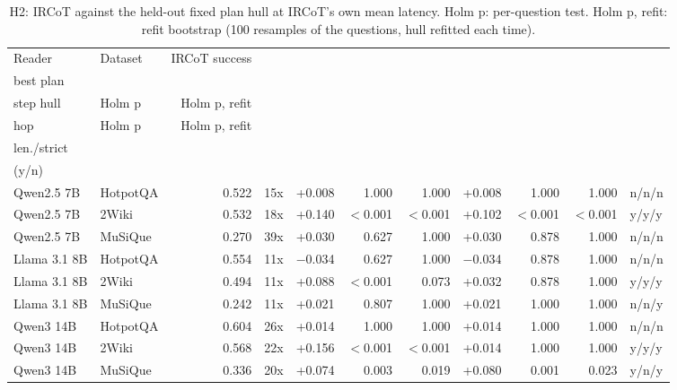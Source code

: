 \begin{table}[t]
\centering\small
\setlength{\tabcolsep}{2pt}
\caption{H2: IRCoT against the held-out fixed plan hull at IRCoT's own mean latency. Holm p: per-question test. Holm p, refit: refit bootstrap (100 resamples of the questions, hull refitted each time).}
\label{tab:h3}
\begin{tabular*}{\linewidth}{@{\extracolsep{\fill}}llrrrrrrrrl}
\toprule
Reader & Dataset & IRCoT success & \begin{tabular}[b]{@{}r@{}}Latency vs \\ best plan\end{tabular} & \begin{tabular}[b]{@{}r@{}}Gain, single \\ step hull\end{tabular} & Holm p & Holm p, refit & \begin{tabular}[b]{@{}r@{}}Gain, with two \\ hop\end{tabular} & Holm p  & Holm p, refit  & \begin{tabular}[b]{@{}l@{}}Sig. final/ \\ len./strict \\ (y/n)\end{tabular} \\
\midrule
Qwen2.5 7B & HotpotQA & 0.522 & 15x & +0.008 & 1.000 & 1.000 & +0.008 & 1.000 & 1.000 & n/n/n \\
Qwen2.5 7B & 2Wiki & 0.532 & 18x & +0.140 & $<$0.001 & $<$0.001 & +0.102 & $<$0.001 & $<$0.001 & y/y/y \\
Qwen2.5 7B & MuSiQue & 0.270 & 39x & +0.030 & 0.627 & 1.000 & +0.030 & 0.878 & 1.000 & n/n/n \\
Llama 3.1 8B & HotpotQA & 0.554 & 11x & $-$0.034 & 0.627 & 1.000 & $-$0.034 & 0.878 & 1.000 & n/n/n \\
Llama 3.1 8B & 2Wiki & 0.494 & 11x & +0.088 & $<$0.001 & 0.073 & +0.032 & 0.878 & 1.000 & y/y/y \\
Llama 3.1 8B & MuSiQue & 0.242 & 11x & +0.021 & 0.807 & 1.000 & +0.021 & 1.000 & 1.000 & n/n/y \\
Qwen3 14B & HotpotQA & 0.604 & 26x & +0.014 & 1.000 & 1.000 & +0.014 & 1.000 & 1.000 & n/n/n \\
Qwen3 14B & 2Wiki & 0.568 & 22x & +0.156 & $<$0.001 & $<$0.001 & +0.014 & 1.000 & 1.000 & y/y/y \\
Qwen3 14B & MuSiQue & 0.336 & 20x & +0.074 & 0.003 & 0.019 & +0.080 & 0.001 & 0.023 & y/n/y \\
\bottomrule
\end{tabular*}
\end{table}
